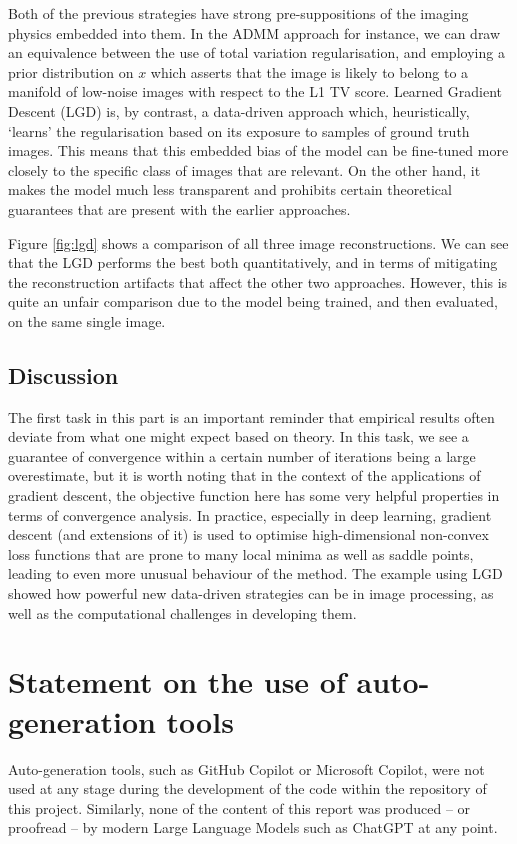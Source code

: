 \documentclass[12pt]{article}
\begin{document}
Both of the previous strategies have strong pre-suppositions of the imaging physics embedded into them.
In the ADMM approach for instance, we can draw an equivalence between the use of total variation regularisation,
and employing a prior distribution on $x$ which asserts that the image is likely to belong to a manifold of low-noise images with respect to the L1 TV score.
Learned Gradient Descent (LGD) is, by contrast, a data-driven approach which, heuristically, `learns' the regularisation based on its exposure to samples of ground truth images.
This means that this embedded bias of the model can be fine-tuned more closely to the specific class of images that are relevant.
On the other hand, it makes the model much less transparent and prohibits certain theoretical guarantees that are present with the earlier approaches.

Figure \ref{fig:lgd} shows a comparison of all three image reconstructions.
We can see that the LGD performs the best both quantitatively,
and in terms of mitigating the reconstruction artifacts that affect the other two approaches.
However, this is quite an unfair comparison due to the model being trained, and then evaluated, on the same single image.

\subsection{Discussion}

The first task in this part is an important reminder that empirical results often deviate from what one might expect based on theory.
In this task, we see a guarantee of convergence within a certain number of iterations being a large overestimate,
but it is worth noting that in the context of the applications of gradient descent,
the objective function here has some very helpful properties in terms of convergence analysis.
In practice, especially in deep learning, gradient descent (and extensions of it) is used to optimise high-dimensional non-convex loss functions that are prone to many local minima as well as saddle points,
leading to even more unusual behaviour of the method.
The example using LGD showed how powerful new data-driven strategies can be in image processing,
as well as the computational challenges in developing them.




\appendix

\section{Statement on the use of auto-generation tools}

Auto-generation tools, such as GitHub Copilot or Microsoft Copilot, were not used at any stage during the development of the code within the repository of this project.
Similarly, none of the content of this report was produced -- or proofread -- by modern Large Language Models such as ChatGPT at any point.
\end{document}
